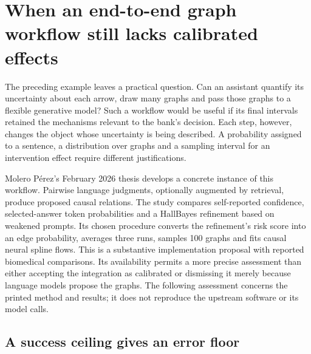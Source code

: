 \section{When an end-to-end graph workflow still lacks calibrated effects}
\label{rel64:graph-confidence}

The preceding example leaves a practical question. Can an assistant quantify
its uncertainty about each arrow, draw many graphs and pass those graphs to a
flexible generative model? Such a workflow would be useful if its final
intervals retained the mechanisms relevant to the bank's decision. Each step,
however, changes the object whose uncertainty is being described. A probability
assigned to a sentence, a distribution over graphs and a sampling interval for
an intervention effect require different justifications.

Molero P{\'e}rez's February 2026 thesis develops a concrete instance of this
workflow. Pairwise language judgments, optionally augmented by retrieval,
produce proposed causal relations. The study compares self-reported
confidence, selected-answer token probabilities and a HallBayes refinement
based on weakened prompts. Its chosen procedure converts the refinement's
risk score into an edge probability, averages three runs, samples 100 graphs
and fits causal neural spline flows. This is a substantive implementation
proposal with reported biomedical comparisons. Its availability permits a
more precise assessment than either accepting the integration as calibrated
or dismissing it merely because language models propose the graphs. The
following assessment concerns the printed method and results; it does not
reproduce the upstream software or its model calls. \citep{rel64molero}

\subsection{A success ceiling gives an error floor}

